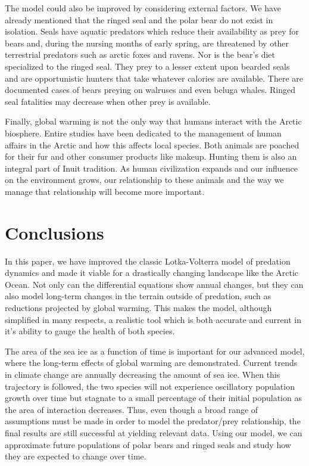 \documentclass[reqno,11pt]{amsart}
\begin{document}
The model could also be improved by considering external factors. We have already mentioned that the ringed seal and the polar bear do not exist in isolation. Seals have aquatic predators which reduce their availability as prey for bears and, during the nursing months of early spring, are threatened by other terrestrial predators such as arctic foxes and ravens.\cite{Citta} Nor is the bear’s diet specialized to the ringed seal. They prey to a lesser extent upon bearded seals and are opportunistic hunters that take whatever calories are available. There are documented cases of bears preying on walruses and even beluga whales. Ringed seal fatalities may decrease when other prey is available.\cite{Bears}

Finally, global warming is not the only way that humans interact with the Arctic biosphere. Entire studies have been dedicated to the management of human affairs in the Arctic and how this affects local species. Both animals are poached for their fur and other consumer products like makeup. Hunting them is also an integral part of Inuit tradition. As human civilization expands and our influence on the environment grows, our relationship to these animals and the way we manage that relationship will become more important.

\section{Conclusions}
\label{sec:conclusions}
In this paper, we have improved the classic Lotka-Volterra model of predation dynamics and made it viable for a drastically changing landscape like the Arctic Ocean. Not only can the differential equations show annual changes, but they can also model long-term changes in the terrain outside of predation, such as reductions projected by global warming. This makes the model, although simplified in many respects, a realistic tool which is both accurate and current in it’s ability to gauge the health of both species.

The area of the sea ice as a function of time is important for our advanced model, where the long-term effects of global warming are demonstrated. Current trends in climate change are annually decreasing the amount of sea ice. When this trajectory is followed, the two species will not experience oscillatory population growth over time but stagnate to a small percentage of their initial population as the area of interaction decreases. Thus, even though a broad range of assumptions must be made in order to model the predator/prey relationship, the final results are still successful at yielding relevant data. Using our model, we can approximate future populations of polar bears and ringed seals and study how they are expected to change over time.
\end{document}
